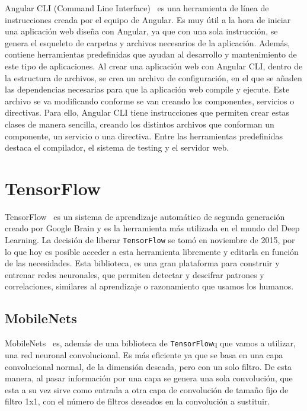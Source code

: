 \documentclass[a4paper, 12pt]{book}
\begin{document}
Angular CLI (Command Line Interface)~\cite{angularcli} es una herramienta de línea de instrucciones creada por el equipo de Angular. Es muy útil a la hora de iniciar una aplicación web diseña con Angular, ya que con una sola instrucción, se genera el esqueleto de carpetas y archivos necesarios de la aplicación. Además, contiene herramientas predefinidas que ayudan al desarrollo y mantenimiento de este tipo de aplicaciones. Al crear una aplicación web con Angular CLI, dentro de la estructura de archivos, se crea un archivo de configuración, en el que se añaden las dependencias necesarias para que la aplicación web compile y ejecute. Este archivo se va modificando conforme se van creando los componentes, servicios o directivas. Para ello, Angular CLI tiene instrucciones que permiten crear estas clases de manera sencilla, creando los distintos archivos que conforman un componente, un servicio o una directiva. Entre las herramientas predefinidas destaca el compilador, el sistema de testing y el servidor web.

\section{TensorFlow} 
\label{sec:tensorflow}

TensorFlow~\cite{tensorflow} es un sistema de aprendizaje automático de segunda generación creado por Google Brain y es la herramienta más utilizada en el mundo del Deep Learning. La decisión de liberar \texttt{TensorFlow} se tomó en noviembre de 2015, por lo que hoy es posible acceder a esta herramienta libremente y editarla en función de las necesidades. Esta biblioteca, es una gran plataforma para construir y entrenar redes neuronales, que permiten detectar y descifrar patrones y correlaciones, similares al aprendizaje o razonamiento que usamos los humanos. 

\subsection{MobileNets} 
\label{sec:mobilenets}

MobileNets~\cite{mobilenets} es, además de una biblioteca de \texttt{TensorFlow}q que vamos a utilizar, una red neuronal convolucional. Es más eficiente ya que se basa en una capa convolucional normal, de la dimensión deseada, pero con un solo filtro. De esta manera, al pasar información por una capa se genera una sola convolución, que esta a su vez sirve como entrada a otra capa de convolución de tamaño fijo de filtro 1x1, con el número de filtros deseados en la convolución a sustituir.
\end{document}
